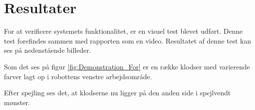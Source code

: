 \chapter{Resultater}\label{chap:Resultater}
For at verificere systemets funktionalitet, er en visuel test blevet udført. Denne test forefindes sammen med rapporten som en video.
Resultatet af denne test kan ses på nedenstående billeder. 

Som det ses på figur \ref{fig:Demonstration_For} er en række klodser med varierende farver lagt op i robottens venstre arbejdsområde. 

Efter spejling ses det, at klodserne nu ligger på den anden side i spejlvendt mønster.